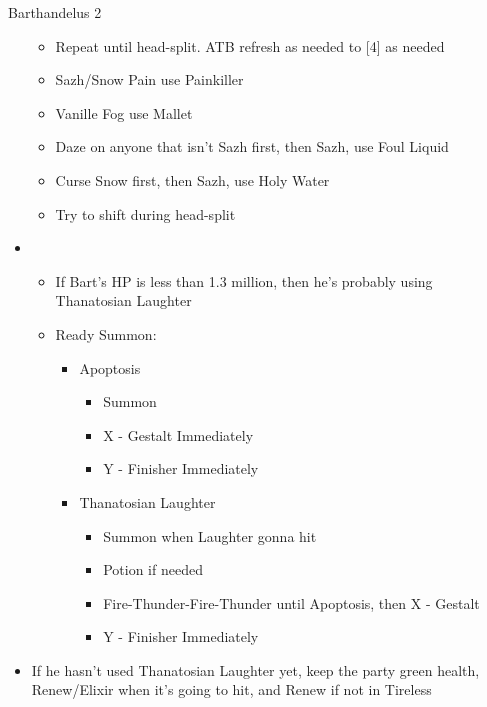 \begin{battle}[2:30 $|$ 2:15]{Barthandelus 2}
\begin{multicols}{2}
\begin{itemize}
            \begin{itemize}
              \item Repeat until head-split. ATB refresh as needed to [4] as needed
              \item Sazh/Snow Pain use Painkiller
              \item Vanille Fog use Mallet
              \item Daze on anyone that isn't Sazh first, then Sazh, use Foul Liquid
              \item Curse Snow first, then Sazh, use Holy Water
              \item Try to shift during head-split
            \end{itemize}
      \item \fifth
            \begin{itemize}
              \item If Bart's HP is less than 1.3 million, then he's probably using Thanatosian Laughter
              \item Ready Summon:
                    \begin{itemize}
                      \item Apoptosis
                            \begin{itemize}
                              \item Summon
                              \item X - Gestalt Immediately
                              \item Y - Finisher Immediately
                            \end{itemize}
                      \item Thanatosian Laughter
                            \begin{itemize}
                              \item Summon when Laughter gonna hit
                              \item Potion if needed
                              \item Fire-Thunder-Fire-Thunder until Apoptosis, then X - Gestalt
                              \item Y - Finisher Immediately
                            \end{itemize}
                    \end{itemize}
            \end{itemize}
            \columnbreak
      \item If he hasn't used Thanatosian Laughter yet, keep the party green health, Renew/Elixir when it's going to hit, and Renew if not in Tireless

\end{itemize}
\end{multicols}
\end{battle}
